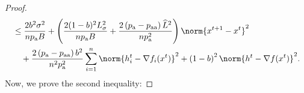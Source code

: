\documentclass{article}
\newcommand*{\probavailable}{\ensuremath{p_{\textnormal{a}}}}
\newcommand*{\probpairaa}{\ensuremath{p_{\textnormal{aa}}}}
\begin{document}
\begin{proof}
\begin{align*}
    &\leq \frac{2 b^2 \sigma^2}{n \probavailable B} + \left(\frac{2 (1 - b)^2 L_{\sigma}^2}{n \probavailable B} + \frac{2\left(\probavailable - \probpairaa\right) \widehat{L}^2}{n \probavailable^2} \right) \norm{x^{t+1} - x^{t}}^2\\
    &\quad + \frac{2 \left(\probavailable - \probpairaa\right) b^2}{n^2 \probavailable^2} \sum_{i=1}^n \norm{h^t_i - \nabla f_i(x^{t})}^2 + \left(1 - b\right)^2 \norm{h^{t} - \nabla f(x^{t})}^2.
  \end{align*}
  Now, we prove the second inequality:

\end{proof}
\end{document}
